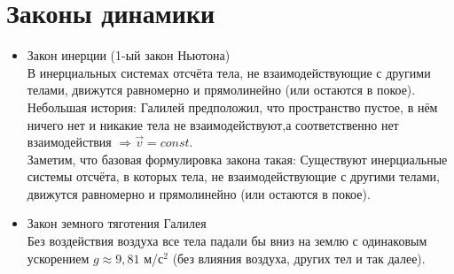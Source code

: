 \documentclass[11pt]{article}
\begin{document}
\section{Законы динамики}
\begin{itemize}
    \item Закон инерции (1-ый закон Ньютона)\\
    В инерциальных системах отсчёта тела, не взаимодействующие с другими телами, движутся равномерно и прямолинейно (или остаются в покое).\\
    Небольшая история: Галилей предположил, что пространство пустое, в нём ничего нет и никакие тела не взаимодействуют,а соответственно нет взаимодействия $\Rightarrow \vec{v}  = const.$\\
    Заметим, что базовая формулировка закона такая: Существуют инерциальные системы отсчёта, в которых тела, не взаимодействующие с другими телами, движутся равномерно и прямолинейно (или остаются в покое).
    \item  Закон земного тяготения Галилея\\
    Без воздействия воздуха все тела падали бы вниз на землю с одинаковым ускорением $ g \approx 9,81$  м/с$^2$ (без влияния воздуха, других тел и так далее). 
\end{itemize}
\end{document}
